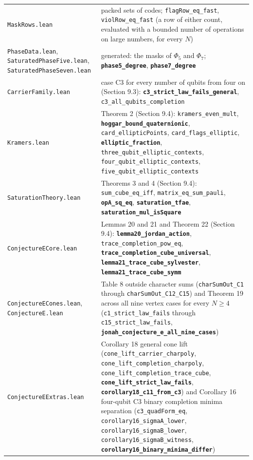 \documentclass[11pt,a4paper]{article}
\begin{document}
{{\begin{longtable}[]{@{}>{\raggedright\arraybackslash}p{}>{\raggedright\arraybackslash}p{}@{}}
\texttt{MaskRows.lean} & packed sets of codes; \texttt{flagRow\_eq\_fast}, \texttt{violRow\_eq\_fast} (a row of either count, evaluated with a bounded number of operations on large numbers, for every \(N\)) \\
\texttt{PhaseData.lean}, \nolinkurl{SaturatedPhaseFive.lean}, \nolinkurl{SaturatedPhaseSeven.lean} & generated: the masks of \(\Phi_5\) and \(\Phi_7\); \textbf{\texttt{phase5\_degree}}, \textbf{\texttt{phase7\_degree}} \\
\nolinkurl{CarrierFamily.lean} & case C3 for every number of qubits from four on (Section 9.3): \textbf{\nolinkurl{c3_strict_law_fails_general}}, \nolinkurl{c3_all_qubits_completion} \\
\texttt{Kramers.lean} & Theorem 2 (Section 9.4): \texttt{kramers\_even\_mult}, \textbf{\nolinkurl{hoggar_bound_quaternionic}}, \nolinkurl{card_ellipticPoints}, \nolinkurl{card_flags_elliptic}, \textbf{\texttt{elliptic\_fraction}}, \nolinkurl{three_qubit_elliptic_contexts}, \nolinkurl{four_qubit_elliptic_contexts}, \nolinkurl{five_qubit_elliptic_contexts} \\
\nolinkurl{SaturationTheory.lean} & Theorems 3 and 4 (Section 9.4): \texttt{sum\_cube\_eq\_iff}, \nolinkurl{matrix_eq_sum_pauli}, \textbf{\texttt{opA\_sq\_eq}}, \textbf{\texttt{saturation\_tfae}}, \textbf{\nolinkurl{saturation_mul_isSquare}} \\
\nolinkurl{ConjectureECore.lean} & Lemmas 20 and 21 and Theorem 22 (Section 9.4): \textbf{\nolinkurl{lemma20_jordan_action}}, \nolinkurl{trace_completion_pow_eq}, \textbf{\nolinkurl{trace_completion_cube_universal}}, \textbf{\nolinkurl{lemma21_trace_cube_sylvester}}, \textbf{\nolinkurl{lemma21_trace_cube_symm}} \\
\nolinkurl{ConjectureECones.lean}, \texttt{ConjectureE.lean} & Table 8 outside character sums (\texttt{charSumOut\_C1} through \nolinkurl{charSumOut_C12_C15}) and Theorem 19 across all nine vertex cases for every \(N\ge4\) (\nolinkurl{c1_strict_law_fails} through \nolinkurl{c15_strict_law_fails}, \textbf{\nolinkurl{jonah_conjecture_e_all_nine_cases}}) \\
\nolinkurl{ConjectureEExtras.lean} & Corollary 18 general cone lift (\nolinkurl{cone_lift_carrier_charpoly}, \nolinkurl{cone_lift_completion_charpoly}, \nolinkurl{cone_lift_completion_trace_cube}, \textbf{\nolinkurl{cone_lift_strict_law_fails}}, \textbf{\nolinkurl{corollary18_c11_from_c3}}) and Corollary 16 four-qubit C3 binary completion minima separation (\texttt{c3\_quadForm\_eq}, \nolinkurl{corollary16_sigmaA_lower}, \nolinkurl{corollary16_sigmaB_lower}, \nolinkurl{corollary16_sigmaB_witness}, \textbf{\nolinkurl{corollary16_binary_minima_differ}}) \\

\end{longtable}}}
\end{document}
